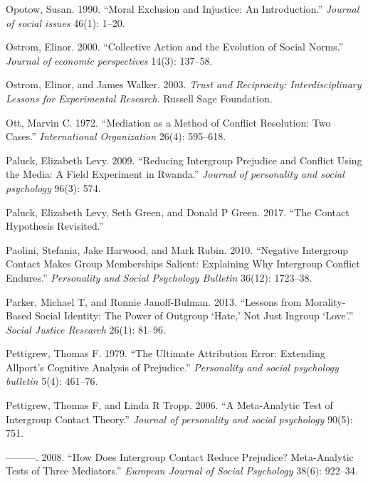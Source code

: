 \documentclass[11pt]{article}
\begin{document}
\hypertarget{ref-opotow1990moral}{}
Opotow, Susan. 1990. ``Moral Exclusion and Injustice: An Introduction.''
\emph{Journal of social issues} 46(1): 1--20.

\hypertarget{ref-ostrom2000collective}{}
Ostrom, Elinor. 2000. ``Collective Action and the Evolution of Social
Norms.'' \emph{Journal of economic perspectives} 14(3): 137--58.

\hypertarget{ref-ostrom2003trust}{}
Ostrom, Elinor, and James Walker. 2003. \emph{Trust and Reciprocity:
Interdisciplinary Lessons for Experimental Research}. Russell Sage
Foundation.

\hypertarget{ref-ott1972mediation}{}
Ott, Marvin C. 1972. ``Mediation as a Method of Conflict Resolution: Two
Cases.'' \emph{International Organization} 26(4): 595--618.

\hypertarget{ref-paluck2009jsp}{}
Paluck, Elizabeth Levy. 2009. ``Reducing Intergroup Prejudice and
Conflict Using the Media: A Field Experiment in Rwanda.'' \emph{Journal
of personality and social psychology} 96(3): 574.

\hypertarget{ref-paluck2017contact}{}
Paluck, Elizabeth Levy, Seth Green, and Donald P Green. 2017. ``The
Contact Hypothesis Revisited.''

\hypertarget{ref-paolini2010negative}{}
Paolini, Stefania, Jake Harwood, and Mark Rubin. 2010. ``Negative
Intergroup Contact Makes Group Memberships Salient: Explaining Why
Intergroup Conflict Endures.'' \emph{Personality and Social Psychology
Bulletin} 36(12): 1723--38.

\hypertarget{ref-parker2013lessons}{}
Parker, Michael T, and Ronnie Janoff-Bulman. 2013. ``Lessons from
Morality-Based Social Identity: The Power of Outgroup `Hate,' Not Just
Ingroup `Love'.'' \emph{Social Justice Research} 26(1): 81--96.

\hypertarget{ref-pettigrew1979ultimate}{}
Pettigrew, Thomas F. 1979. ``The Ultimate Attribution Error: Extending
Allport's Cognitive Analysis of Prejudice.'' \emph{Personality and
social psychology bulletin} 5(4): 461--76.

\hypertarget{ref-pettigrew2006meta}{}
Pettigrew, Thomas F, and Linda R Tropp. 2006. ``A Meta-Analytic Test of
Intergroup Contact Theory.'' \emph{Journal of personality and social
psychology} 90(5): 751.

\hypertarget{ref-pettigrew2008does}{}
---------. 2008. ``How Does Intergroup Contact Reduce Prejudice?
Meta-Analytic Tests of Three Mediators.'' \emph{European Journal of
Social Psychology} 38(6): 922--34.
\end{document}
